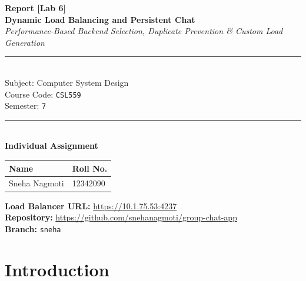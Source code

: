 \documentclass[12pt, a4paper]{article}
\begin{document}
\begin{titlepage}
    \centering
    \vspace*{1cm}

    {\LARGE\bfseries Report [Lab 6] }\\[0.5cm]
    {\Huge\bfseries Dynamic Load Balancing and Persistent Chat}\\[0.8cm]
    {\large\itshape Performance-Based Backend Selection, Duplicate Prevention \& Custom Load Generation}\\[1.2cm]

    \rule{\textwidth}{0.5pt}\\[0.5cm]

    {\large Subject: Computer System Design}\\[0.3cm]
    {\large Course Code: \texttt{CSL559}}\\[0.3cm]
    {\large Semester: \texttt{7}}\\[0.5cm]

    \rule{\textwidth}{0.5pt}\\[1.2cm]

    {\large\bfseries Individual Assignment}\\[0.5cm]

    \begin{tabular}{ll}
        \toprule
        \textbf{Name} & \textbf{Roll No.}\\
        \midrule
        Sneha Nagmoti & 12342090 \\
        \bottomrule
    \end{tabular}

\vspace{1cm}

\begin{center}
    \textbf{Load Balancer URL:} \url{https://10.1.75.53:4237}\\[0.3cm]
    \textbf{Repository:} \url{https://github.com/snehanagmoti/group-chat-app}\\[0.1cm]
    \textbf{Branch:} \texttt{sneha}
\end{center}

    \vfill

\end{titlepage}

\newpage
\tableofcontents
\newpage

\section{Introduction}
\end{document}
